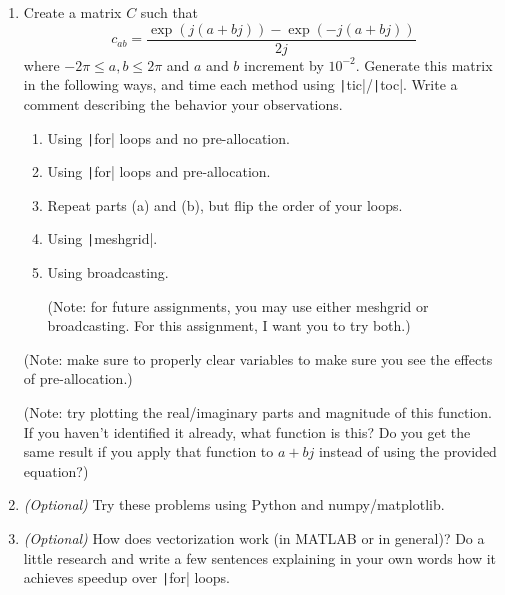 \documentclass{article}
\begin{document}
\begin{enumerate}
\item Create a matrix $C$ such that
  \begin{equation*}
    c_{ab}=\frac{\exp(j(a+bj))-\exp(-j(a+bj))}{2j}
  \end{equation*}
  where $-2\pi\le a,b\le 2\pi$ and $a$ and $b$ increment by $10^{-2}$. Generate this matrix in the following ways, and time each method using \texttt|tic|/\texttt|toc|. Write a comment describing the behavior your observations.
  \begin{enumerate}
  \item Using \texttt|for| loops and no pre-allocation.
  \item Using \texttt|for| loops and pre-allocation.
  \item Repeat parts (a) and (b), but flip the order of your loops.
  \item Using \texttt|meshgrid|.
  \item Using broadcasting.

    (Note: for future assignments, you may use either meshgrid or broadcasting. For this assignment, I want you to try both.)
  \end{enumerate}

  (Note: make sure to properly clear variables to make sure you see the effects of pre-allocation.)

  (Note: try plotting the real/imaginary parts and magnitude of this function. If you haven't identified it already, what function is this? Do you get the same result if you apply that function to $a+bj$ instead of using the provided equation?)
    
\item \textit{(Optional)} Try these problems using Python and numpy/matplotlib.
  
\item \textit{(Optional)} How does vectorization work (in MATLAB or in general)? Do a little research and write a few sentences explaining in your own words how it achieves speedup over \texttt|for| loops.
\end{enumerate}
\end{document}
